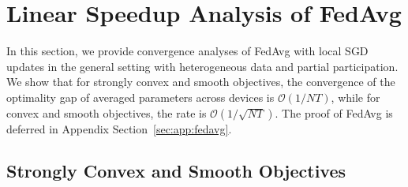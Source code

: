


\section{Linear Speedup Analysis of FedAvg}
\label{sec:sgd}

In this section, we provide convergence analyses of FedAvg with local
SGD updates in the general setting with heterogeneous data and partial
participation. We show that for strongly convex and smooth objectives,
the convergence of the optimality gap of averaged parameters across
devices is $\mathcal{O}(1/NT)$, while for convex and smooth
objectives, the rate is $\mathcal{O}(1/\sqrt{NT})$. 
The proof of FedAvg is deferred in Appendix Section~\ref{sec:app:fedavg}.

\subsection{Strongly Convex and Smooth Objectives}

